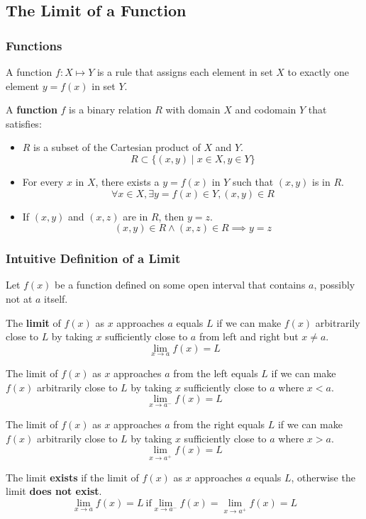 \subsection{The Limit of a Function}

\subsubsection{Functions}
A function \(f:X\mapsto Y\) is a rule that assigns each element in set \(X\)
to exactly one element \(y=f(x)\) in set \(Y\).
\begin{definition}
    A \textbf{function} \(f\) is a binary relation \(R\) with domain \(X\) and
    codomain \(Y\) that satisfies:
    \begin{itemize}
        \item \(R\) is a subset of the Cartesian product of \(X\) and \(Y\).
        \[R\subset\{(x,y)\mid x\in X,y\in Y\}\]
        \item For every \(x\) in \(X\), there exists a \(y=f(x)\) in \(Y\)
        such that \((x,y)\) is in \(R\).
        \[\forall x\in X,\exists y=f(x)\in Y,(x,y)\in R\]
        \item If \((x,y)\) and \((x,z)\) are in \(R\), then \(y=z\).
        \[(x,y)\in R \wedge (x,z)\in R \implies y=z\]
    \end{itemize}
\end{definition}

\subsubsection{Intuitive Definition of a Limit}
Let \(f(x)\) be a function defined on some open interval that contains \(a\),
possibly not at \(a\) itself.
\begin{definition}
    The \textbf{limit} of \(f(x)\) as \(x\) approaches \(a\) equals \(L\) if
    we can make \(f(x)\) arbitrarily close to \(L\) by taking \(x\)
    sufficiently close to \(a\) from left and right but \(x\neq a\).
    \[\lim_{x\to a}f(x)=L\]
\end{definition}
\begin{definition}
    The limit of \(f(x)\) as \(x\) approaches \(a\) from the left equals \(L\)
    if we can make \(f(x)\) arbitrarily close to \(L\) by taking \(x\)
    sufficiently close to \(a\) where \(x<a\).
    \[\lim_{x\to a^-}f(x)=L\]
\end{definition}
\begin{definition}
    The limit of \(f(x)\) as \(x\) approaches \(a\) from the right equals
    \(L\) if we can make \(f(x)\) arbitrarily close to \(L\) by taking \(x\)
    sufficiently close to \(a\) where \(x>a\).
    \[\lim_{x\to a^+}f(x)=L\]
\end{definition}
The limit \textbf{exists} if the limit of \(f(x)\) as \(x\) approaches \(a\)
equals \(L\), otherwise the limit \textbf{does not exist}.
\[\lim_{x\to a}f(x)=L\ \text{if} \lim_{x\to a^-}f(x)=\lim_{x\to a^+}f(x)=L\]